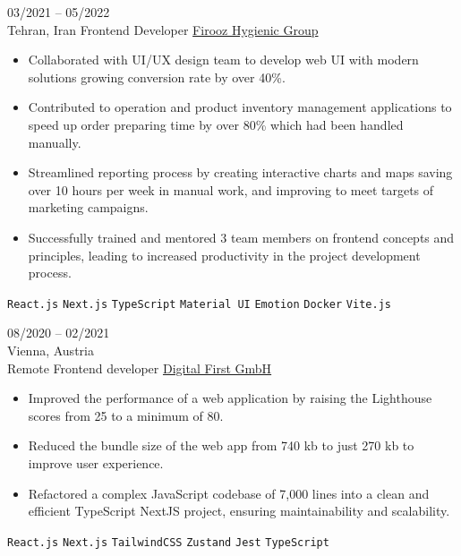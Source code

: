 \documentclass[8pt]{developercv} %
\begin{document}
\begin{entrylist}
        \entry
        {03/2021 -- 05/2022 \\ Tehran, Iran}
        {Frontend Developer}
        {\href{https://firoozshop.com/}{Firooz Hygienic Group}}
        {\vspace{-10pt}
            \begin{itemize}[noitemsep,topsep=0pt,parsep=0pt,partopsep=0pt, leftmargin=-1pt]
                \item Collaborated with UI/UX design team to develop web UI with modern solutions growing conversion rate by over 40\%.
                \item Contributed to operation and product inventory management applications to speed up order preparing time by over 80\% which had been handled manually.
                \item Streamlined reporting process by creating interactive charts and maps saving over 10 hours per week in manual work, and improving to meet targets of marketing campaigns.
                \item Successfully trained and mentored 3 team members on frontend concepts and principles, leading to increased productivity in the project development process.
            \end{itemize}
            \texttt{React.js} \slashsep \texttt{Next.js} \slashsep \texttt{TypeScript} \slashsep \texttt{Material UI} \slashsep \texttt{Emotion} \slashsep \texttt{Docker} \slashsep \texttt{Vite.js}
        }

        \entry
        {08/2020 -- 02/2021 \\ Vienna, Austria \\ Remote}
        {Frontend developer}
        {\href{https://dfirst.eu/}{Digital First GmbH}}
        {\vspace{-10pt}
            \begin{itemize}[noitemsep,topsep=0pt,parsep=0pt,partopsep=0pt, leftmargin=-1pt]
                \item Improved the performance of a web application by raising the Lighthouse scores from 25 to a minimum of 80.
                \item Reduced the bundle size of the web app from 740 kb to just 270 kb to improve user experience.
                \item Refactored a complex JavaScript codebase of 7,000 lines into a clean and efficient TypeScript NextJS project, ensuring maintainability and scalability.
            \end{itemize}
            \texttt{React.js} \slashsep \texttt{Next.js} \slashsep \texttt{TailwindCSS} \slashsep \texttt{Zustand} \slashsep \texttt{Jest} \slashsep \texttt{TypeScript}
        }


\end{entrylist}
\end{document}
